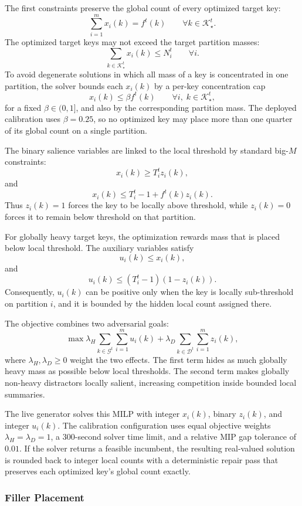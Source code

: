 \documentclass[sigconf, nonacm]{acmart}
\begin{document}
The first constraints preserve the global count of every optimized target key:
\[
\sum_{i=1}^m x_i(k)=f^t(k)
\qquad\forall k\in\mathcal K_\star^t.
\]
The optimized target keys may not exceed the target partition masses:
\[
\sum_{k\in\mathcal K_\star^t} x_i(k)\le N_i^t
\qquad\forall i.
\]
To avoid degenerate solutions in which all mass of a key is concentrated in one partition, the solver bounds each \(x_i(k)\) by a per-key concentration cap
\[
x_i(k)\le \beta f^t(k)
\qquad\forall i,\; k\in\mathcal K_\star^t,
\]
for a fixed \(\beta\in(0,1]\), and also by the corresponding partition mass. The deployed calibration uses \(\beta=0.25\), so no optimized key may place more than one quarter of its global count on a single partition.

The binary salience variables are linked to the local threshold by standard big-\(M\) constraints:
\[
x_i(k)\ge T_i^t z_i(k),
\]
and
\[
x_i(k)\le T_i^t-1+f^t(k)z_i(k).
\]
Thus \(z_i(k)=1\) forces the key to be locally above threshold, while \(z_i(k)=0\) forces it to remain below threshold on that partition.

For globally heavy target keys, the optimization rewards mass that is placed below local threshold. The auxiliary variables satisfy
\[
u_i(k)\le x_i(k),
\]
and
\[
u_i(k)\le (T_i^t-1)(1-z_i(k)).
\]
Consequently, \(u_i(k)\) can be positive only when the key is locally sub-threshold on partition \(i\), and it is bounded by the hidden local count assigned there.

The objective combines two adversarial goals:
\[
\max
\lambda_H
\sum_{k\in\mathcal G^t}\sum_{i=1}^m u_i(k)
+
\lambda_D
\sum_{k\in\mathcal D^t}\sum_{i=1}^m z_i(k),
\]
where \(\lambda_H,\lambda_D\ge 0\) weight the two effects. The first term hides as much globally heavy mass as possible below local thresholds. The second term makes globally non-heavy distractors locally salient, increasing competition inside bounded local summaries.

The live generator solves this MILP with integer \(x_i(k)\), binary \(z_i(k)\), and integer \(u_i(k)\). The calibration configuration uses equal objective weights \(\lambda_H=\lambda_D=1\), a 300-second solver time limit, and a relative MIP gap tolerance of \(0.01\). If the solver returns a feasible incumbent, the resulting real-valued solution is rounded back to integer local counts with a deterministic repair pass that preserves each optimized key's global count exactly.

\subsubsection{Filler Placement}
\end{document}
